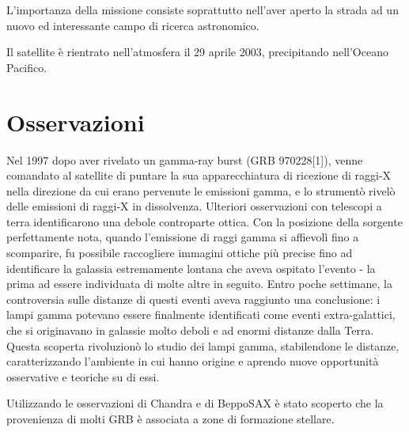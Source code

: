 \documentclass[12pt,a4paper]{article}
\begin{document}
 L'importanza della missione consiste soprattutto nell'aver aperto la strada ad un nuovo ed interessante campo di ricerca astronomico.

Il satellite è rientrato nell'atmosfera il 29 aprile 2003, precipitando nell'Oceano Pacifico.

\section*{Osservazioni}
\label{osservazioni}

Nel 1997 dopo aver rivelato un gamma-ray burst (GRB 970228[1]), venne comandato al satellite di puntare la sua apparecchiatura di ricezione di raggi-X nella direzione da cui erano pervenute le emissioni gamma, e lo strumentò rivelò delle emissioni di raggi-X in dissolvenza. Ulteriori osservazioni con telescopi a terra identificarono una debole controparte ottica. Con la posizione della sorgente perfettamente nota, quando l'emissione di raggi gamma si affievolì fino a scomparire, fu possibile raccogliere immagini ottiche più precise fino ad identificare la galassia estremamente lontana che aveva ospitato l'evento - la prima ad essere individuata di molte altre in seguito. Entro poche settimane, la controversia sulle distanze di questi eventi aveva raggiunto una conclusione: i lampi gamma potevano essere finalmente identificati come eventi extra-galattici, che si originavano in galassie molto deboli e ad enormi distanze dalla Terra. Questa scoperta rivoluzionò lo studio dei lampi gamma, stabilendone le distanze, caratterizzando l'ambiente in cui hanno origine e aprendo nuove opportunità osservative e teoriche su di essi.

Utilizzando le osservazioni di Chandra e di BeppoSAX è stato scoperto che la provenienza di molti GRB è associata a zone di formazione stellare.
\end{document}

